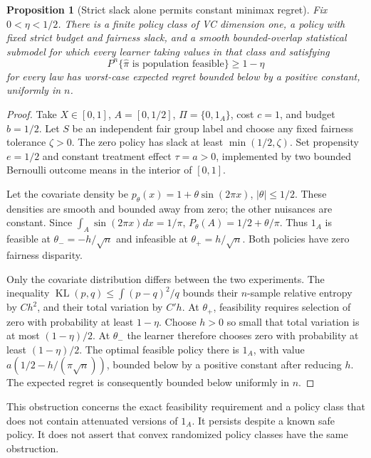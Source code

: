\documentclass[11pt]{article}
\newtheorem{proposition}[theorem]{Proposition}
\theoremstyle{remark}
\begin{document}
\begin{proposition}[Strict slack alone permits constant minimax regret]
Fix $0<\eta<1/2$. There is a finite policy class of VC dimension one, a policy with fixed strict budget and fairness slack, and a smooth bounded-overlap statistical submodel for which every learner taking values in that class and satisfying
\[
 P^n\{\widehat\pi\text{ is population feasible}\}\ge1-\eta
\]
for every law has worst-case expected regret bounded below by a positive constant, uniformly in $n$.
\end{proposition}
\begin{proof}
Take $X\in[0,1]$, $A=[0,1/2]$, $\Pi=\{0,1_A\}$, cost $c=1$, and budget $b=1/2$. Let $S$ be an independent fair group label and choose any fixed fairness tolerance $\zeta>0$. The zero policy has slack at least $\min(1/2,\zeta)$. Set propensity $e=1/2$ and constant treatment effect $\tau=a>0$, implemented by two bounded Bernoulli outcome means in the interior of $[0,1]$.

Let the covariate density be $p_\theta(x)=1+\theta\sin(2\pi x)$, $|\theta|\le1/2$. These densities are smooth and bounded away from zero; the other nuisances are constant. Since $\int_A\sin(2\pi x)dx=1/\pi$,
$P_\theta(A)=1/2+\theta/\pi$. Thus $1_A$ is feasible at $\theta_-=-h/\sqrt n$ and infeasible at $\theta_+=h/\sqrt n$. Both policies have zero fairness disparity.

Only the covariate distribution differs between the two experiments. The inequality $\operatorname{KL}(p,q)\le\int(p-q)^2/q$ bounds their $n$-sample relative entropy by $C h^2$, and their total variation by $C'h$. At $\theta_+$, feasibility requires selection of zero with probability at least $1-\eta$. Choose $h>0$ so small that total variation is at most $(1-\eta)/2$. At $\theta_-$ the learner therefore chooses zero with probability at least $(1-\eta)/2$. The optimal feasible policy there is $1_A$, with value $a(1/2-h/(\pi\sqrt n))$, bounded below by a positive constant after reducing $h$. The expected regret is consequently bounded below uniformly in $n$.
\end{proof}
This obstruction concerns the exact feasibility requirement and a policy class that does not contain attenuated versions of $1_A$. It persists despite a known safe policy. It does not assert that convex randomized policy classes have the same obstruction.
\end{document}
